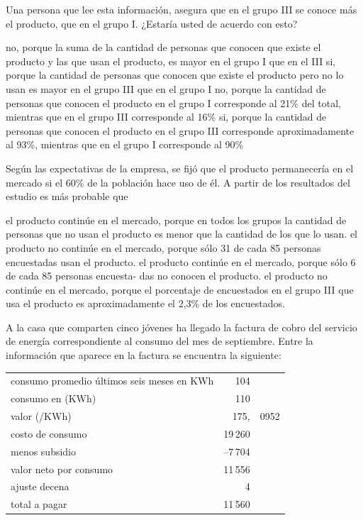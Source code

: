 \documentclass[10pt,addpoints]{exam}
\begin{document}
\begin{questions}
\question \label{q03}
Una persona que lee esta información, asegura que en el grupo III se conoce más el producto, que en el grupo I. ¿Estaría usted de acuerdo con esto?
\begin{choices}
\choice no, porque la suma de la cantidad de personas que conocen que existe el producto y las que usan el producto, es mayor en el grupo I que en el III
\choice si, porque la cantidad de personas que conocen que existe el producto pero no lo usan es mayor en el grupo III que en el grupo I
\choice no, porque la cantidad de personas que conocen el producto en el grupo I corresponde al 21\% del total, mientras que en el grupo III corresponde al 16\%
\CorrectChoice si, porque la cantidad de personas que conocen el producto en el grupo III corresponde aproximadamente al 93\%, mientras que en el grupo I corresponde al 90\%
\end{choices}
\question \label{q04} Según las expectativas de la empresa, se fijó que el producto permanecería en el mercado si el 60\% de la población hace uso de él. A partir de los resultados del estudio es más probable que
\begin{choices}
\choice el producto continúe en el mercado, porque en todos los grupos la cantidad de personas que no usan el producto es menor que la cantidad de los que lo usan.
\CorrectChoice el producto no continúe en el mercado, porque sólo 31 de cada 85 personas encuestadas usan el producto.
\choice el producto continúe en el mercado, porque sólo 6 de cada 85 personas encuesta-
das no conocen el producto.
\choice el producto no continúe en el mercado, porque el porcentaje de encuestados en el
grupo III que usa el producto es aproximadamente el 2,3\% de los encuestados.
\end{choices}

A la casa que comparten cinco jóvenes ha llegado la factura de cobro del servicio de energía correspondiente al consumo del mes de septiembre. Entre la información que aparece en la factura 
se encuentra la siguiente:
\begin{center}
\begin{tabular}{lr@{}l}
consumo promedio últimos seis meses en KWh & 104 & \\ 
consumo en (KWh) & 110 & \\ 
valor (/KWh) & 175, & 0952 \\ 
costo de consumo & 19\,260 & \\ 
menos subsidio & --7\,704 & \\ 
valor neto por consumo & 11\,556 & \\ 
ajuste decena & 4 & \\ 
total a pagar & 11\,560 &
\end{tabular}
\end{center}


\end{questions}
\end{document}
